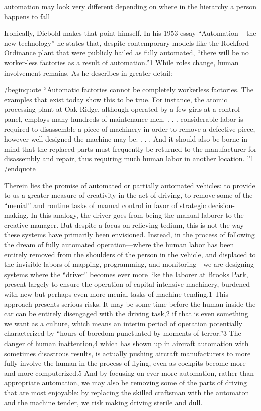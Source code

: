 automation may look very different depending on where in the hierarchy
a person happens to fall

Ironically, Diebold makes that point himself. In his 1953 essay
“Automation – the new technology” he states that, despite contemporary
models like the Rockford Ordinance plant that were publicly hailed as
fully automated, “there will be no worker-less factories as a result
of automation.”1 While roles change, human involvement remains. As he
describes in greater detail:

/begin{quote}
“Automatic factories cannot be completely workerless factories. The
examples that exist today show this to be true. For instance, the
atomic processing plant at Oak Ridge, although operated by a few girls
at a control panel, employs many hundreds of maintenance men. . . .
considerable labor is required to disassemble a piece of machinery in
order to remove a defective piece, however well designed the machine
may be. . . . And it should also be borne in mind that the replaced
parts must frequently be returned to the manufacturer for disassembly
and repair, thus requiring much human labor in another location. ”1
/end{quote}

Therein lies the promise of automated or partially automated vehicles:
to provide to us a greater measure of creativity in the act of
driving, to remove some of the “menial” and routine tasks of manual
control in favor of strategic decision-making. In this analogy, the
driver goes from being the manual laborer to the creative manager. But
despite a focus on relieving tedium, this is not the way these systems
have primarily been envisioned. Instead, in the process of following
the dream of fully automated operation—where the human labor has been
entirely removed from the shoulders of the person in the vehicle, and
displaced to the invisible labors of mapping, programming, and
monitoring—we are designing systems where the “driver” becomes ever
more like the laborer at Brooks Park, present largely to ensure the
operation of capital-intensive machinery, burdened with new but
perhaps even more menial tasks of machine tending.1 This approach
presents serious risks. It may be some time before the human inside
the car can be entirely disengaged with the driving task,2 if that is
even something we want as a culture, which means an interim period of
operation potentially characterized by “hours of boredom punctuated by
moments of terror.”3 The danger of human inattention,4 which has shown
up in aircraft automation with sometimes disastrous results, is
actually pushing aircraft manufacturers to more fully involve the
human in the process of flying, even as cockpits become more and more
computerized.5 And by focusing on ever more automation, rather than
appropriate automation, we may also be removing some of the parts of
driving that are most enjoyable: by replacing the skilled craftsman
with the automaton and the machine tender, we risk making driving
sterile and dull. 

